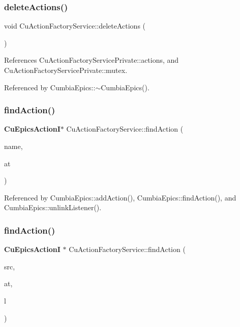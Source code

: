 \subsubsection{delete\+Actions()}
{\footnotesize\ttfamily void Cu\+Action\+Factory\+Service\+::delete\+Actions (\begin{DoxyParamCaption}{ }\end{DoxyParamCaption})}



References Cu\+Action\+Factory\+Service\+Private\+::actions, and Cu\+Action\+Factory\+Service\+Private\+::mutex.



Referenced by Cumbia\+Epics\+::$\sim$\+Cumbia\+Epics().

\mbox{\label{classCuActionFactoryService_a91f61fed56b625368e433fd8a27cb6f8}} 
\subsubsection{find\+Action()\hspace{0.1cm}{\footnotesize\ttfamily [1/2]}}
{\footnotesize\ttfamily \textbf{ Cu\+Epics\+ActionI}$\ast$ Cu\+Action\+Factory\+Service\+::find\+Action (\begin{DoxyParamCaption}\item[{const std\+::string \&}]{name,  }\item[{\textbf{ Cu\+Epics\+Action\+I\+::\+Type}}]{at }\end{DoxyParamCaption})}



Referenced by Cumbia\+Epics\+::add\+Action(), Cumbia\+Epics\+::find\+Action(), and Cumbia\+Epics\+::unlink\+Listener().

\mbox{\label{classCuActionFactoryService_a22e2c9c85c25782c0eddda54a5a9c340}} 
\subsubsection{find\+Action()\hspace{0.1cm}{\footnotesize\ttfamily [2/2]}}
{\footnotesize\ttfamily \textbf{ Cu\+Epics\+ActionI} $\ast$ Cu\+Action\+Factory\+Service\+::find\+Action (\begin{DoxyParamCaption}\item[{const std\+::string \&}]{src,  }\item[{\textbf{ Cu\+Epics\+Action\+I\+::\+Type}}]{at,  }\item[{Cu\+Data\+Listener $\ast$}]{l }\end{DoxyParamCaption})}



